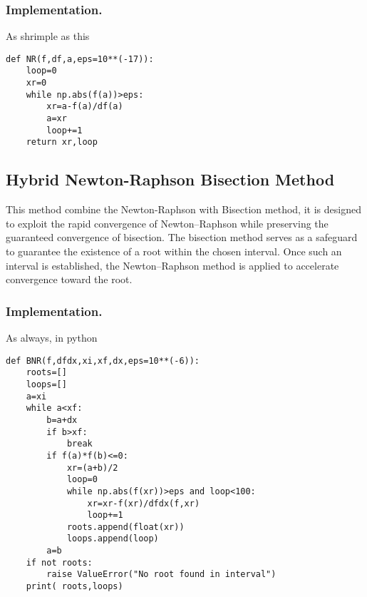 \documentclass[../../../main.tex]{subfiles}
\begin{document}
\subsubsection{Implementation.}
As shrimple as this
\begin{verbatim}
def NR(f,df,a,eps=10**(-17)):
    loop=0 
    xr=0
    while np.abs(f(a))>eps:
        xr=a-f(a)/df(a)
        a=xr 
        loop+=1
    return xr,loop
\end{verbatim}

\subsection{Hybrid Newton-Raphson Bisection Method}
This method combine the Newton-Raphson with Bisection method, it is designed to exploit the rapid convergence of Newton–Raphson while preserving the guaranteed convergence of bisection.
The bisection method serves as a safeguard to guarantee the existence of a root within the chosen interval.
Once such an interval is established, the Newton–Raphson method is applied to accelerate convergence toward the root.

\subsubsection*{Implementation.} As always, in python
\begin{verbatim}
def BNR(f,dfdx,xi,xf,dx,eps=10**(-6)):
    roots=[]
    loops=[]
    a=xi
    while a<xf:
        b=a+dx 
        if b>xf:
            break
        if f(a)*f(b)<=0:
            xr=(a+b)/2
            loop=0 
            while np.abs(f(xr))>eps and loop<100:
                xr=xr-f(xr)/dfdx(f,xr)
                loop+=1
            roots.append(float(xr))
            loops.append(loop)
        a=b
    if not roots:
        raise ValueError("No root found in interval")
    print( roots,loops)
\end{verbatim}
\end{document}

